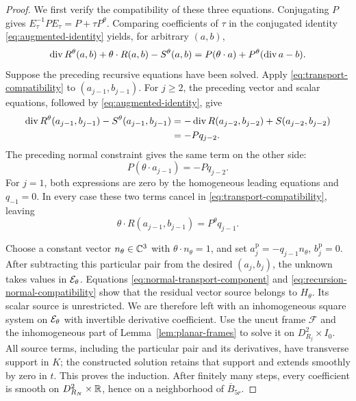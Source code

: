 \begin{proof}
We first verify the compatibility of these three equations.
Conjugating $P$ gives $E_\tau^{-1}PE_\tau=P+\tau P^\theta$.
Comparing coefficients of $\tau$ in the conjugated identity
\eqref{eq:augmented-identity} yields, for arbitrary $(a,b)$,
\begin{equation}
\label{eq:transport-compatibility}
 \operatorname{div} R^\theta(a,b)+\theta\cdot R(a,b)-S^\theta(a,b)
 =P(\theta\cdot a)+P^\theta(\operatorname{div} a-b).
\end{equation}
Suppose the preceding recursive equations have been solved.
Apply \eqref{eq:transport-compatibility} to $(a_{j-1},b_{j-1})$.
For $j\ge2$, the preceding vector and scalar equations, followed by
\eqref{eq:augmented-identity}, give
\[
 \begin{aligned}
 \operatorname{div} R^\theta(a_{j-1},b_{j-1})
       -S^\theta(a_{j-1},b_{j-1})
   &=-\operatorname{div} R(a_{j-2},b_{j-2})+S(a_{j-2},b_{j-2})\\
   &=-Pq_{j-2}.
 \end{aligned}
\]
The preceding normal constraint gives the same term on the other side:
\[
 P(\theta\cdot a_{j-1})=-Pq_{j-2}.
\]
For $j=1$, both expressions are zero by the homogeneous leading
equations and $q_{-1}=0$. In every case these two terms cancel in
\eqref{eq:transport-compatibility}, leaving
\begin{equation}
\label{eq:recursion-normal-compatibility}
 \theta\cdot R(a_{j-1},b_{j-1})=P^\theta q_{j-1}.
\end{equation}

Choose a constant vector $n_\theta\in\mathbb C^3$ with
$\theta\cdot n_\theta=1$, and set
$a_j^{\mathrm p}=-q_{j-1}n_\theta$, $b_j^{\mathrm p}=0$.
After subtracting this particular pair from the desired
$(a_j,b_j)$, the unknown takes values in $\mathcal E_\theta$.
Equations \eqref{eq:normal-transport-component} and
\eqref{eq:recursion-normal-compatibility} show that the residual
vector source belongs to $H_\theta$. Its scalar source is
unrestricted. We are therefore left with an inhomogeneous
square system on $\mathcal E_\theta$ with invertible derivative
coefficient. Use the uncut frame $\mathcal F$ and the
inhomogeneous part of Lemma~\ref{lem:planar-frames} to solve it
on $D_{R_j}^2\times I_0$. All source terms, including the
particular pair and its derivatives, have transverse support
in $K$; the constructed solution retains that support and
extends smoothly by zero in $t$. This proves the induction.
After finitely many steps, every coefficient is smooth on
$D_{R_N}^2\times\mathbb R$, hence on a neighborhood of
$\overline B_{5r}$.


\end{proof}
